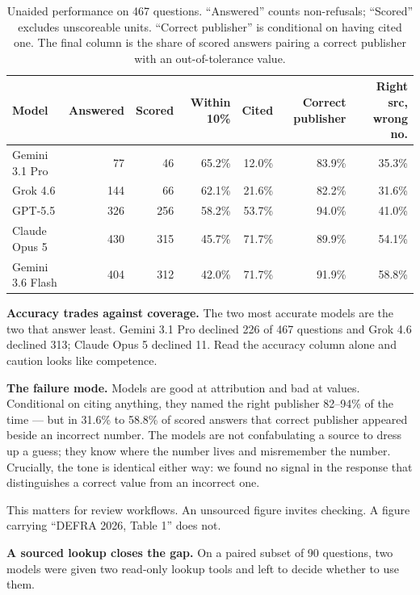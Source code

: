 \documentclass[10pt,a4paper]{article}
\begin{document}
\begin{table}[h]
\centering
\small
\setlength{\tabcolsep}{4.5pt}
\begin{tabular}{lrrrrrr}
\toprule
Model & Answered & Scored & Within 10\% & Cited & Correct publisher & \textbf{Right src, wrong no.} \\
\midrule
Gemini 3.1 Pro    &  77 &  46 & 65.2\% & 12.0\% & 83.9\% & 35.3\% \\
Grok 4.6          & 144 &  66 & 62.1\% & 21.6\% & 82.2\% & 31.6\% \\
GPT-5.5           & 326 & 256 & 58.2\% & 53.7\% & 94.0\% & 41.0\% \\
Claude Opus 5     & 430 & 315 & 45.7\% & 71.7\% & 89.9\% & 54.1\% \\
Gemini 3.6 Flash  & 404 & 312 & 42.0\% & 71.7\% & 91.9\% & 58.8\% \\
\bottomrule
\end{tabular}
\vspace{-0.3em}
\caption{\small Unaided performance on 467 questions. ``Answered'' counts non-refusals; ``Scored'' excludes unscoreable units. ``Correct publisher'' is conditional on having cited one. The final column is the share of scored answers pairing a correct publisher with an out-of-tolerance value.}
\end{table}
\vspace{-1.2em}

\textbf{Accuracy trades against coverage.} The two most accurate models are the two that answer least. Gemini 3.1 Pro declined 226 of 467 questions and Grok 4.6 declined 313; Claude Opus 5 declined 11. Read the accuracy column alone and caution looks like competence.

\textbf{The failure mode.} Models are good at attribution and bad at values. Conditional on citing anything, they named the right publisher 82--94\% of the time --- but in 31.6\% to 58.8\% of scored answers that correct publisher appeared beside an incorrect number. The models are not confabulating a source to dress up a guess; they know where the number lives and misremember the number. Crucially, the tone is identical either way: we found no signal in the response that distinguishes a correct value from an incorrect one.

This matters for review workflows. An unsourced figure invites checking. A figure carrying ``DEFRA 2026, Table 1'' does not.

\textbf{A sourced lookup closes the gap.} On a paired subset of 90 questions, two models were given two read-only lookup tools and left to decide whether to use them.
\end{document}

